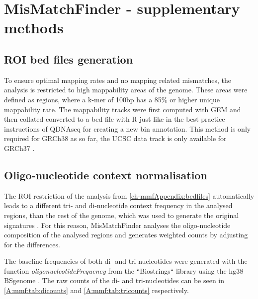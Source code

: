 \chapter{MisMatchFinder - supplementary methods}
\label{ch-mmfSuppMeth}

\section{ROI bed files generation}
\label{ch-mmfAppendix:bedfiles}

To ensure optimal mapping rates and no mapping related mismatches, the analysis is restricted to high mappability areas of the genome. These areas were defined as regions, where a k-mer of 100bp has a 85\% or higher unique mappability rate. The mappability tracks were first computed with GEM \cite{Derrien2012} and then collated converted to a bed file with R just like in the best practice instructions of QDNAseq \cite{Scheinin2014} for creating a new bin annotation. This method is only required for GRCh38 \cite{Schneider2017} as so far, the UCSC data track is only available for GRCh37 \cite{Church2011}.

\section{Oligo-nucleotide context normalisation}
\label{ch-mmfAppendix:oligoNorm}
The ROI restriction of the analysis from \autoref{ch-mmfAppendix:bedfiles} automatically leads to a different tri- and di-nucleotide context frequency in the analysed regions, than the rest of the genome, which was used to generate the original signatures \cite{Alexandrov2020}. For this reason, MisMatchFinder analyses the oligo-nucleotide composition of the analysed regions and generates weighted counts by adjusting for the differences. 

The baseline frequencies of both di- and tri-nucleotides were generated with the function \textit{oligonucleotideFrequency} from the ``Biostrings`` library \cite{Pages2020} using the hg38 BSgenome \cite{Pages2020a}. The raw counts of the di- and tri-nucleotides can be seen in \autoref{A:mmf:tab:dicounts} and \autoref{A:mmf:tab:tricounts} respectively.





